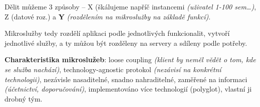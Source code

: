 Dělit můžeme 3 způsoby -- X (škálujeme napříč instancemi \textit{(uživatel 1-100 sem\ldots)}, Z (datové roz.) a \textbf{Y} \textit{(rozdělením na mikroslužby na základě funkcí)}.

\vspace{4pt}
\noindent Mikroslužby tedy rozdělí aplikaci podle jednotlivých funkcionalit, vytvoří jednotlivé služby, a ty můžou být rozděleny na servery a sdíleny podle potřeby.

\textbf{Charakteristika mikroslužeb}: loose coupling \textit{(klient by neměl vědět o tom, kde se služba nachází)}, technology-agnostic protokol \textit{(nezávisí na konkrétní technologii)}, nezávisle nasaditelné, snadno nahraditelné, zaměřené na informaci \textit{(účetnictví, doporučování)}, implementováno více technologií (polyglot), vlastní ji drobný tým.
